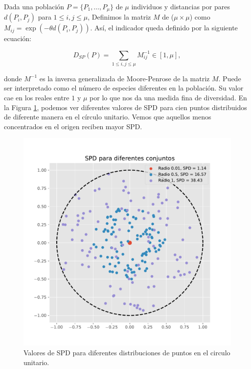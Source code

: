 Dada una población $P = \{P_1, \ldots, P_\mu\}$ de $\mu$ individuos y distancias por pares $d(P_i, P_j)$ para $1 \leq i,j \leq \mu$, Definimos la matriz $M$ de ($\mu \times \mu$) como $M_{ij} = \exp(-\theta  d(P_i, P_j))$. Así, el indicador queda definido por la siguiente ecuación:

\begin{equation} \label{eq:SPD}
    D_{SP}(P) = \sum_{1 \leq i,j \leq \mu} M_{ij}^{-1} \in [1, \mu], \nonumber
\end{equation}


donde $M^{-1}$ es la inversa generalizada de Moore-Penrose de la matriz $M$. Puede ser interpretado como el número de especies diferentes en la población. Su valor cae en los reales entre $1$ y $\mu$ por lo que nos da una medida fina de diversidad. En la Figura \ref{fig:SPD}, podemos ver diferentes valores de SPD para cien puntos distribuidos de diferente manera en el círculo unitario. Vemos que aquellos menos concentrados en el origen reciben mayor SPD. 

\begin{figure}[H]
    \centering
    \includegraphics[scale=0.7]{../Figuras/SPD_demo.pdf}
    \caption[SPD]{Valores de SPD para diferentes distribuciones de puntos en el circulo unitario.}
    \label{fig:SPD}
\end{figure}



